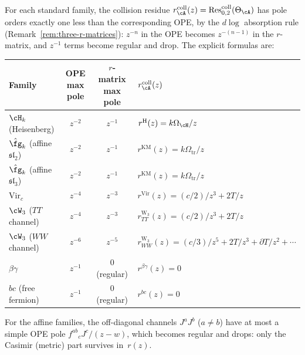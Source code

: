 
\begin{proposition}
\label{prop:rmatrix-pole-landscape}
For each standard family, the collision residue
$r^{\mathrm{coll}}_\cA(z) = \operatorname{Res}^{\mathrm{coll}}_{0,2}(\Theta_\cA)$
has pole orders exactly one less than the corresponding OPE, by the
$d\log$ absorption rule
\textup{(}Remark~\textup{\ref{rem:three-r-matrices})}:
$z^{-n}$ in the OPE becomes $z^{-(n-1)}$ in the $r$-matrix, and
$z^{-1}$ terms become regular and drop.
The explicit formulas are:
\begin{center}
\renewcommand{\arraystretch}{1.2}
\begin{tabular}{lccl}
\toprule
\textbf{Family}
& \textbf{OPE max pole}
& \textbf{$r$-matrix max pole}
& \textbf{$r^{\mathrm{coll}}_\cA(z)$} \\
\midrule
$\cH_k$ (Heisenberg)
 & $z^{-2}$ & $z^{-1}$
 & $r^{\mathrm{H}}(z) = k\Omega_{\cH}/z$ \\[3pt]
$\hat\fg_k$ (affine $\mathfrak{sl}_2$)
 & $z^{-2}$ & $z^{-1}$
 & $r^{\mathrm{KM}}(z) = k\Omega_{\mathrm{tr}}/z$ \\[3pt]
$\hat\fg_k$ (affine $\mathfrak{sl}_3$)
 & $z^{-2}$ & $z^{-1}$
 & $r^{\mathrm{KM}}(z) = k\Omega_{\mathrm{tr}}/z$ \\[3pt]
$\mathrm{Vir}_c$
 & $z^{-4}$ & $z^{-3}$
 & $r^{\mathrm{Vir}}(z) = (c/2)/z^3 + 2T/z$ \\[3pt]
$\cW_3$ ($TT$ channel)
 & $z^{-4}$ & $z^{-3}$
 & $r^{\mathrm{W}_3}_{TT}(z) = (c/2)/z^3 + 2T/z$ \\[3pt]
$\cW_3$ ($WW$ channel)
 & $z^{-6}$ & $z^{-5}$
 & $r^{\mathrm{W}_3}_{WW}(z)
 = (c/3)/z^5 + 2T/z^3 + \partial T/z^2 + \cdots$ \\[3pt]
$\beta\gamma$
 & $z^{-1}$ & $0$ (regular)
 & $r^{\beta\gamma}(z) = 0$ \\[3pt]
$bc$ (free fermion)
 & $z^{-1}$ & $0$ (regular)
 & $r^{bc}(z) = 0$ \\
\bottomrule
\end{tabular}
\end{center}
For the affine families, the off-diagonal channels
$J^a J^b$ ($a \neq b$) have at most a simple OPE pole
$f^{ab}{}_{c}J^c/(z{-}w)$, which becomes regular and drops:
only the Casimir (metric) part survives in~$r(z)$.
\end{proposition}

